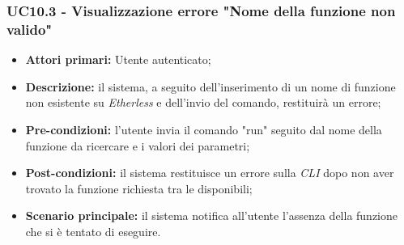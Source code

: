 \subsubsection{UC10.3 - Visualizzazione errore "Nome della funzione non valido"}
\begin{itemize}
	\item \textbf{Attori primari:} Utente autenticato;
	\item \textbf{Descrizione:} il sistema, a seguito dell'inserimento di un nome di funzione non esistente su \textit{Etherless} e dell'invio del comando, restituirà un errore; 
	\item \textbf{Pre-condizioni:} l'utente invia il comando "run" seguito dal nome della funzione da ricercare e i valori dei parametri;
	\item \textbf{Post-condizioni:} il sistema restituisce un errore sulla \textit{CLI\glo} dopo non aver trovato la funzione richiesta tra le disponibili;
	\item \textbf{Scenario principale:} il sistema notifica all'utente l'assenza della funzione che si è tentato di eseguire.
\end{itemize}